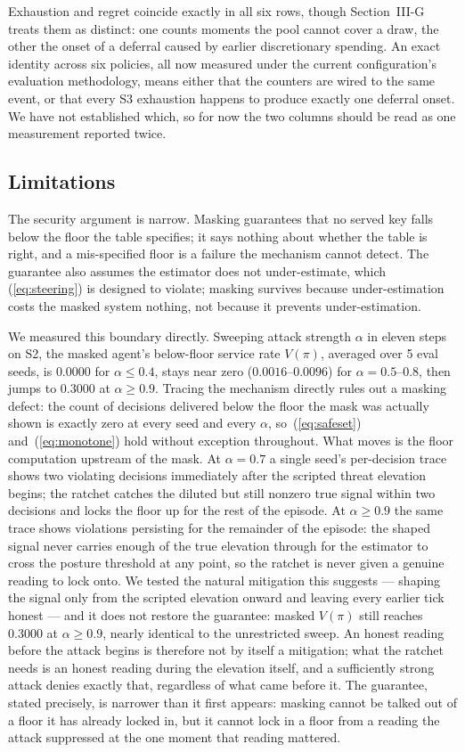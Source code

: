 \documentclass[conference]{IEEEtran}
\begin{document}
Exhaustion and regret coincide exactly in all six rows,
though Section~III-G treats them as distinct: one counts
moments the pool cannot cover a draw, the other the onset of
a deferral caused by earlier discretionary spending. An exact
identity across six policies, all now measured under the current
configuration's evaluation methodology, means either that the
counters are wired to the same event, or that every S3 exhaustion
happens to produce exactly one deferral onset. We have not
established which, so for now the two columns should be read as one
measurement reported twice.

\subsection{Limitations}

The security argument is narrow. Masking guarantees that
no served key falls below the floor the table specifies; it says
nothing about whether the table is right, and a mis-specified
floor is a failure the mechanism cannot detect. The guarantee
also assumes the estimator does not under-estimate, which
(\ref{eq:steering}) is designed to violate; masking survives because under-estimation costs the masked system nothing, not because it
prevents under-estimation.

We measured this boundary directly. Sweeping attack strength $\alpha$
in eleven steps on S2, the masked agent's below-floor service rate
$V(\pi)$, averaged over 5 eval seeds, is $0.0000$ for $\alpha \le 0.4$,
stays near zero ($0.0016$--$0.0096$) for $\alpha = 0.5$--$0.8$, then
jumps to $0.3000$ at $\alpha \ge 0.9$. Tracing the mechanism directly
rules out a masking defect: the count of decisions delivered below the
floor the mask was actually shown is exactly zero at every seed and
every $\alpha$, so~(\ref{eq:safeset}) and~(\ref{eq:monotone}) hold
without exception throughout. What moves is the floor computation
upstream of the mask. At $\alpha=0.7$ a single seed's per-decision
trace shows two violating decisions immediately after the scripted
threat elevation begins; the ratchet catches the diluted but still
nonzero true signal within two decisions and locks the floor up for
the rest of the episode. At $\alpha \ge 0.9$ the same trace shows
violations persisting for the remainder of the episode: the shaped
signal never carries enough of the true elevation through for the
estimator to cross the posture threshold at any point, so the ratchet
is never given a genuine reading to lock onto. We tested the natural
mitigation this suggests --- shaping the signal only from the scripted
elevation onward and leaving every earlier tick honest --- and it does
not restore the guarantee: masked $V(\pi)$ still reaches $0.3000$ at
$\alpha \ge 0.9$, nearly identical to the unrestricted sweep. An honest
reading before the attack begins is therefore not by itself a
mitigation; what the ratchet needs is an honest reading during the
elevation itself, and a sufficiently strong attack denies exactly
that, regardless of what came before it. The guarantee, stated
precisely, is narrower than it first appears: masking cannot be talked
out of a floor it has already locked in, but it cannot lock in a floor
from a reading the attack suppressed at the one moment that reading
mattered.
\end{document}
